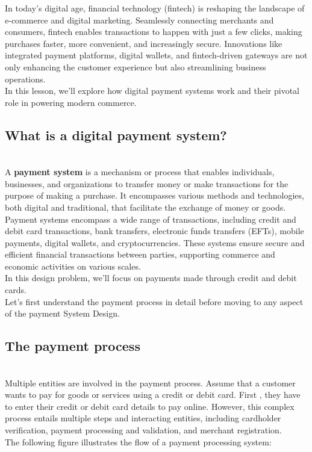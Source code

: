 

In today's digital age, financial technology (fintech) is reshaping the landscape of e-commerce and digital marketing. Seamlessly connecting merchants and consumers, fintech enables transactions to happen with just a few clicks, making purchases faster, more convenient, and increasingly secure. Innovations like integrated payment platforms, digital wallets, and fintech-driven gateways are not only enhancing the customer experience but also streamlining business operations.
\\
In this lesson, we'll explore how digital payment systems work and their pivotal role in powering modern commerce.

\subsection{What is a digital payment system?}\label{6JtsN4LBgDbI8LUC_UPQp}
\\
A \textbf{payment system} is a mechanism or process that enables individuals, businesses, and organizations to transfer money or make transactions for the purpose of making a purchase. It encompasses various methods and technologies, both digital and traditional, that facilitate the exchange of money or goods. Payment systems encompass a wide range of transactions, including credit and debit card transactions, bank transfers, electronic funds transfers (EFTs), mobile payments, digital wallets, and cryptocurrencies. These systems ensure secure and efficient financial transactions between parties, supporting commerce and economic activities on various scales.
\\
In this design problem, we'll focus on payments made through credit and debit cards.
\\
Let's first understand the payment process in detail before moving to any aspect of the payment System Design.

\subsection{The payment process}\label{vCPKyd9_GLSVbGtqsD0n_}
\\
Multiple entities are involved in the payment process. Assume that a customer wants to pay for goods or services using a credit or debit card. First , they have to enter their credit or debit card details to pay online. However, this complex process entails multiple steps and interacting entities, including cardholder verification, payment processing and validation, and merchant registration.
\\
The following figure illustrates the flow of a payment processing system:

